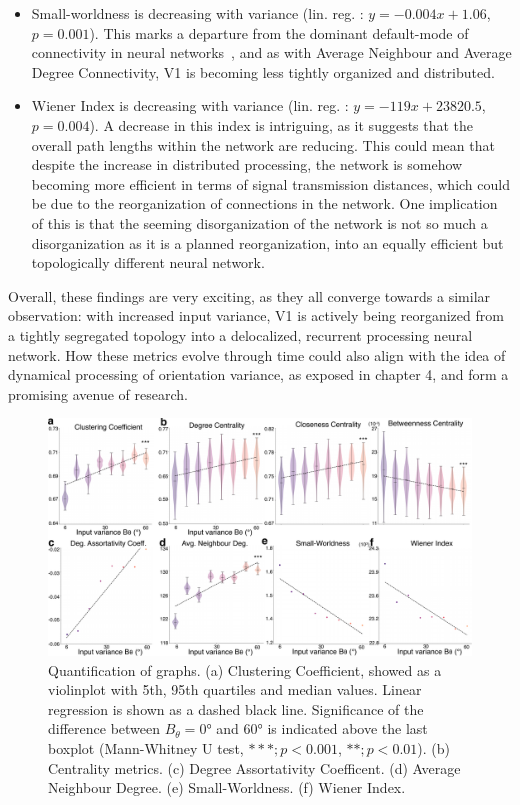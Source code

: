 \begin{itemize}
    \item Small-worldness is decreasing with variance (lin. reg. : $y = -0.004x+1.06$, $p = 0.001$). This marks a departure from the dominant default-mode of connectivity in neural networks~\cite{meunier2010modular}, and as with Average Neighbour and Average Degree Connectivity, \gls{V1} is becoming less tightly organized and distributed.
    
    \item Wiener Index is decreasing with variance (lin. reg. : $y = -119x+23820.5$, $p = 0.004$). A decrease in this index is intriguing, as it suggests that the overall path lengths within the network are reducing. This could mean that despite the increase in distributed processing, the network is somehow becoming more efficient in terms of signal transmission distances, which could be due to the reorganization of connections in the network. One implication of this is that the seeming disorganization of the network is not so much a disorganization as it is a planned reorganization, into an equally efficient but topologically different neural network.
\end{itemize}
Overall, these findings are very exciting, as they all converge towards a similar observation: with increased input variance, \gls{V1} is actively being reorganized from a tightly segregated topology into a delocalized, recurrent processing neural network. How these metrics evolve through time could also align with the idea of dynamical processing of orientation variance, as exposed in chapter 4, and form a promising avenue of research.

\begin{figure}[h!tbp]
\vspace{0.1cm}
\centering
\includegraphics[width=1.\textwidth]{fig/chap5_quantification_graphs.pdf}
\caption[Quantification of graphs.]{Quantification of graphs. (a) Clustering Coefficient, showed as a violinplot with 5th, 95th quartiles and median values. Linear regression is shown as a dashed black line. Significance of the difference between $B_\theta=0$° and $60$° is indicated above the last boxplot (Mann-Whitney U test, $***;p<0.001$, $**;p<0.01$). (b) Centrality metrics. (c) Degree Assortativity Coefficent. (d) Average Neighbour Degree. (e) Small-Worldness. (f) Wiener Index.}
\label{fig_chap5_quantification_graphs} 
\end{figure} 


